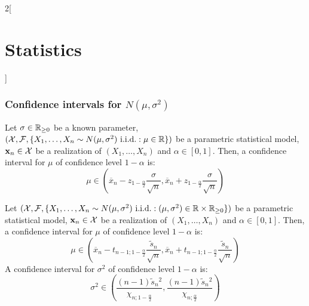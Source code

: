 \documentclass[../../../main.tex]{subfiles}
\begin{document}
\begin{multicols}{2}[\section{Statistics}]
  \subsubsection{Confidence intervals for \texorpdfstring{$N(\mu,\sigma^2)$}{N(mu,sigma2)}}
  \begin{proposition}
    Let $\sigma\in\mathbb{R}_{\geq 0}$ be a known parameter, $(\mathcal{X},\mathcal{F},\{X_1,\ldots,X_n\sim N(\mu,\sigma^2)\text{ i.i.d.}:\mu\in\mathbb{R}\})$ be a parametric statistical model, $\boldsymbol{\mathrm{x}}_n\in\mathcal{X}$ be a realization of $(X_1,\ldots,X_n)$ and $\alpha\in[0,1]$. Then, a confidence interval for $\mu$ of confidence level $1-\alpha$ is:
    $$\mu\in\left(\overline{x}_n-z_{1-\frac{\alpha}{2}}\frac{\sigma}{\sqrt{n}},\overline{x}_n+z_{1-\frac{\alpha}{2}}\frac{\sigma}{\sqrt{n}}\right)$$
  \end{proposition}
  \begin{proposition}
    Let $(\mathcal{X},\mathcal{F},\{X_1,\ldots,X_n\sim N(\mu,\sigma^2)\text{ i.i.d.}:(\mu,\sigma^2)\in\mathbb{R}\times\mathbb{R}_{\geq 0}\})$ be a parametric statistical model, $\boldsymbol{\mathrm{x}}_n\in\mathcal{X}$ be a realization of $(X_1,\ldots,X_n)$ and $\alpha\in[0,1]$. Then, a confidence interval for $\mu$ of confidence level $1-\alpha$ is:
    $$\mu\in\left(\overline{x}_n-t_{n-1;1-\frac{\alpha}{2}}\frac{\tilde{s}_n}{\sqrt{n}},\overline{x}_n+t_{n-1;1-\frac{\alpha}{2}}\frac{\tilde{s}_n}{\sqrt{n}}\right)$$
    A confidence interval for $\sigma^2$ of confidence level $1-\alpha$ is:
    $$\sigma^2\in\left(\frac{(n-1)\tilde{s}_n{}^2}{{\chi_{n;1-\frac{\alpha}{2}}}},\frac{(n-1)\tilde{s}_n{}^2}{{\chi_{n;\frac{\alpha}{2}}}}\right)$$
  \end{proposition}

\end{multicols}
\end{document}

